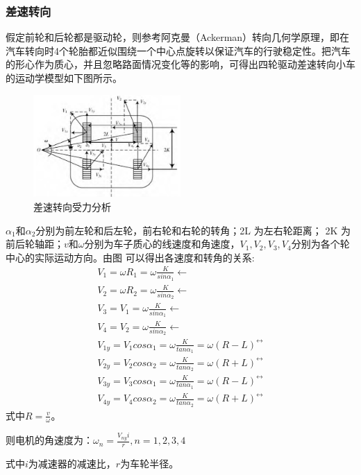 \documentclass{paper}
\begin{document}
\subsubsection{差速转向\cite{chasu}}
\label{subsec:label}
假定前轮和后轮都是驱动轮，则参考阿克曼（Ackerman）转向几何学原理，即在汽车转向时4个轮胎都近似围绕一个中心点旋转以保证汽车的行驶稳定性。把汽车的形心作为质心，并且忽略路面情况变化等的影响，可得出四轮驱动差速转向小车的运动学模型如下图所示。
\begin{figure}[ht]
  \centering
  \includegraphics[width=0.5\textwidth]{figures/chasu.png}
  \caption{差速转向受力分析}
\end{figure}
$\alpha_1$和$\alpha_2$分别为前左轮和后左轮，前右轮和右轮的转角；2L 为左右轮距离； 2K 为前后轮轴距；$v$和$\omega$分别为车子质心的线速度和角速度，$V_1,V_2,V_3,V_4$分别为各个轮中心的实际运动方向。由图 可以得出各速度和转角的关系:
\[\begin{gathered}
V_{1}=\omega R_{1}=\omega\frac{K}{sin\alpha_{1}}\leftarrow \\
V_{2}=\omega R_{2}=\omega\frac{K}{sin\alpha_{2}}\leftarrow \\
V_{3}=V_{1}=\omega\frac{K}{sin\alpha_{1}}\leftarrow \\
V_{4}=V_{2}=\omega\frac{K}{sin\alpha_{2}}\leftarrow \\
V_{1y}=V_{1}cos\alpha_{1}= \omega\frac{K}{tan\alpha_{1}}=\omega(R-L)^{\leftrightarrow}\\
V_{2y}=V_{2}cos\alpha_{2}= \omega\frac{K}{tan\alpha_{2}}=\omega(R+L)^{\leftrightarrow}\\
V_{3y}=V_{3}cos\alpha_{1}= \omega\frac{K}{tan\alpha_{1}}=\omega(R-L)^{\leftrightarrow}\\
V_{4y}=V_{4}cos\alpha_{2}= \omega\frac{K}{tan\alpha_{2}}=\omega(R+L)^{\leftrightarrow}
\end{gathered}\]
式中$R=\frac v\omega $。

则电机的角速度为：$\omega_n=\frac{V_{ny}i}r,n=1,2,3,4$

式中$i$为减速器的减速比，$r$为车轮半径。
\end{document}
